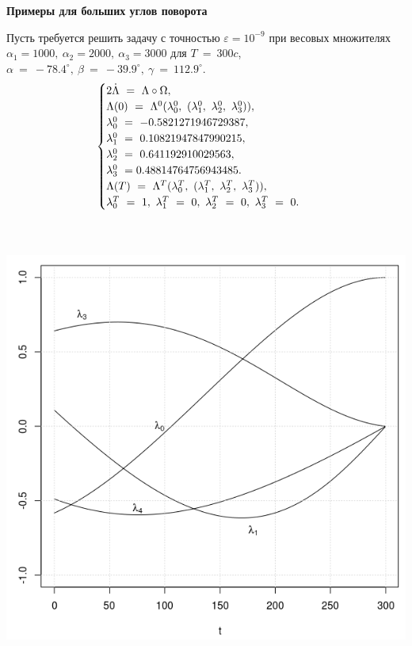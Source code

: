 \documentclass[14pt]{extreport}
\begin{document}
\newpage
\begin{landscape}
\begin{center}
\textbf{Примеры для больших углов поворота}
\end{center}

Пусть требуется решить задачу с точностью $\varepsilon = 10^{-9}$ при весовых множителях $\alpha_1 = 1000,\ \alpha_2 = 2000,\ \alpha_3 = 3000$
для $T\ =\ 300c$, $\alpha\ =\ -78.4^{\circ},\ \beta\ =\ -39.9^{\circ},\ \gamma\ =\ 112.9^{\circ}$.
\begin{equation}
\begin{cases}
2\dot{\Lambda}\ =\ \Lambda \circ \Omega,\\
 \Lambda(0)\ =\ \Lambda^{0}(\lambda_0^{0},\ (\lambda_1^{0},\ \lambda_2^{0},\ \lambda_3^{0})), \\
 \lambda_{0}^{0}\ =\ -0.5821271946729387, \\
 \lambda_{1}^{0}\ =\ 0.10821947847990215, \\
 \lambda_{2}^{0}\ =\ 0.641192910029563, \\
 \lambda_{3}^{0}\ =\-0.48814764756943485. \\
 \Lambda(T)\ =\ \Lambda^{T}(\lambda_0^{T},\ (\lambda_1^{T},\ \lambda_2^{T},\ \lambda_3^{T})), \\
 \lambda_{0}^{T}\ =\ 1, \ 
 \lambda_{1}^{T}\ =\ 0, \ 
 \lambda_{2}^{T}\ =\ 0, \ 
 \lambda_{3}^{T}\ =\ 0. \ 
 \end{cases}
\end{equation}
\end{landscape}

\begin{landscape}
\begin{center}
\includegraphics[width=15cm, height=15cm]{l300.png}
\end{center}
\end{landscape}
\end{document}
